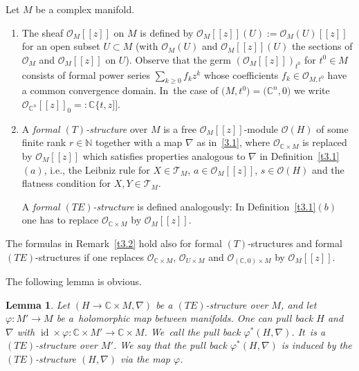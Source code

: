 \documentclass[10pt,a4paper]{amsart}
\numberwithin{equation}{section}
\numberwithin{figure}{section}
\newcommand{\N}{{\mathbb N}}
\newcommand{\C}{{\mathbb C}}
\newcommand{\OO}{{\mathcal O}}
\newcommand{\TT}{{\mathcal T}}
\newcommand{\nnn}{\nabla}
\DeclareMathOperator{\id}{id}
\newtheorem{Lemma}[Theorem]{Lemma}
\begin{document}
\begin{Definition}%
Let $M$ be a complex manifold.
\begin{enumerate}\itemsep=0pt
\item[$(a)$] The sheaf $\OO_M[[z]]$ on $M$ is defined by
$\OO_M[[z]](U):=\OO_M(U)[[z]]$
for an open subset $U\subset M$
(with $\OO_M(U)$ and $\OO_M[[z]](U)$ the sections of
$\OO_M$ and $\OO_M[[z]]$ on $U$).
Observe that the germ $(\OO_M[[z]])_{t^0}$ for $t^0\in M$
consists of formal power series $\sum_{k\geq 0}f_kz^k$ whose
coefficients $f_k\in\OO_{M,t^0}$ have a common
convergence domain. In~the case of $\big(M,t^0\big)=\big(\C^n,0\big)$ we write
$\OO_{\C^n}[[z]]_0=:\C\{t,z]]$.

\item[$(b)$] A {\it formal $(T)$-structure} over $M$ is a free
$\OO_M[[z]]$-module $\OO(H)$ of some finite rank $r\in\N$
together with a map
$\nnn$ as in~\eqref{3.1}, where $\OO_{\C\times M}$ is replaced
by $\OO_M[[z]]$ which satisfies properties analogous to
$\nnn$ in Definition~\ref{t3.1}$(a)$, i.e., the
Leibniz rule for $X\in\TT_M$, \mbox{$a\in\OO_M[[z]]$}, $s\in\OO(H)$
and the flatness condition for $X,Y\in\TT_M$.

A {\it formal $(TE)$-structure} is defined analogously:
In Definition~\ref{t3.1}$(b)$ one has to replace
$\OO_{\C\times M}$ by $\OO_M[[z]]$.
\end{enumerate}
\end{Definition}

\begin{Remark}%
The formulas in Remark~\ref{t3.2} hold also
for formal $(T)$-structures and formal $(TE)$-structures
if one replaces $\OO_{\C\times M}$, $\OO_{U\times M}$
and $\OO_{(\C,0)\times M}$ by $\OO_M[[z]]$.
\end{Remark}

The following lemma is obvious.

\begin{Lemma}\label{t3.6}
Let $(H\to \C\times M,\nnn)$ be a $(TE)$-structure over $M$,
and let $\varphi\colon M'\to M$ be a~holo\-morphic map between
manifolds. One can pull back $H$ and $\nnn$ with
$\id\times\varphi\colon \C\times M'\to\C\times M$.
We~call the pull back $\varphi^*(H,\nnn)$. It~is a
$(TE)$-structure over $M'$. We say that the
pull back $\varphi^*(H,\nnn)$ is induced by the $(TE)$-structure
$(H,\nnn)$ via the map $\varphi$.
\end{Lemma}
\end{document}
